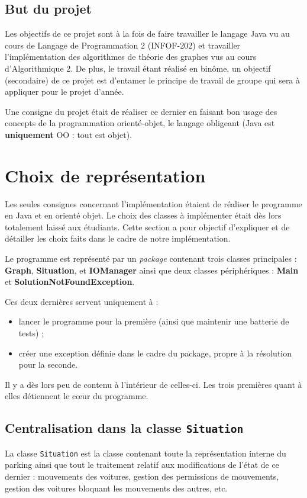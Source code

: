 \documentclass{article}
\begin{document}
	\subsection{But du projet}
		Les objectifs de ce projet sont à la fois de faire travailler le langage Java vu au cours de Langage de Programmation 2 (INFOF-202) et
		travailler l'implémentation des algorithmes de théorie des graphes vus au cours d'Algorithmique 2. De plus, le travail étant réalisé en binôme,
		un objectif (secondaire) de ce projet est d'entamer le principe de travail de groupe qui sera à appliquer pour le projet d'année.

		Une consigne du projet était de réaliser ce dernier en faisant bon usage des concepts de la programmation orienté-objet, le langage
		obligeant (Java est \textbf{uniquement} OO : tout est objet).

\section{Choix de représentation}
	Les seules consignes concernant l'implémentation étaient de réaliser le programme en Java et en orienté objet. Le choix des classes à implémenter était
	dès lors totalement laissé aux étudiants. Cette section a pour objectif d'expliquer et de détailler les choix faits dans le cadre de notre implémentation.

	Le programme est représenté par un \textit{package} contenant trois classes principales : \textbf{Graph}, \textbf{Situation}, et \textbf{IOManager}
	ainsi que deux classes périphériques : \textbf{Main} et \textbf{SolutionNotFoundException}.

	Ces deux dernières servent uniquement à :
	
	\begin{itemize}
		\item lancer le programme pour la première (ainsi que maintenir une batterie de tests) ;
		\item créer une exception définie dans le cadre du package, propre à la résolution pour la seconde.
	\end{itemize}
	
	Il y a dès lors peu de contenu à l'intérieur de celles-ci. Les trois premières quant à elles détiennent le cœur du programme.

	\subsection{Centralisation dans la classe \texttt{Situation}}
		La classe \texttt{Situation} est la classe contenant toute la représentation interne du parking ainsi que tout le traitement relatif aux
		modifications de l'état de ce dernier : mouvements des voitures, gestion des permissions de mouvements, gestion des voitures bloquant
		les mouvements des autres, etc.
\end{document}
